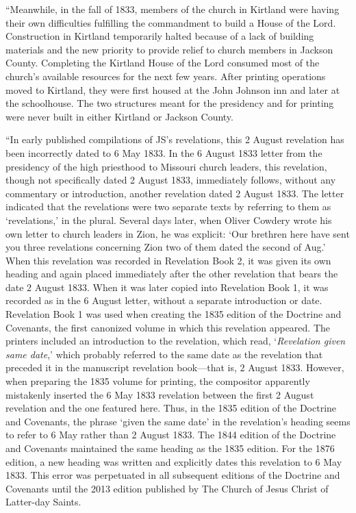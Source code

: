 			``Meanwhile, in the fall of 1833, members of the church in Kirtland were having their own difficulties fulfilling the commandment to build a House of the Lord. Construction in Kirtland temporarily halted because of a lack of building materials and the new priority to provide relief to church members in Jackson County. Completing the Kirtland House of the Lord consumed most of the church's available resources for the next few years. After printing operations moved to Kirtland, they were first housed at the John Johnson inn and later at the schoolhouse. The two structures meant for the presidency and for printing were never built in either Kirtland or Jackson County.
			
			``In early published compilations of JS's revelations, this 2 August revelation has been incorrectly dated to 6 May 1833. In the 6 August 1833 letter from the presidency of the high priesthood to Missouri church leaders, this revelation, though not specifically dated 2 August 1833, immediately follows, without any commentary or introduction, another revelation dated 2 August 1833. The letter indicated that the revelations were two separate texts by referring to them as `revelations,' in the plural. Several days later, when Oliver Cowdery wrote his own letter to church leaders in Zion, he was explicit: `Our brethren here have sent you three revelations concerning Zion two of them dated the second of Aug.' When this revelation was recorded in Revelation Book 2, it was given its own heading and again placed immediately after the other revelation that bears the date 2 August 1833. When it was later copied into Revelation Book 1, it was recorded as in the 6 August letter, without a separate introduction or date. Revelation Book 1 was used when creating the 1835 edition of the Doctrine and Covenants, the first canonized volume in which this revelation appeared. The printers included an introduction to the revelation, which read, `\textit{Revelation given same date},' which probably referred to the same date as the revelation that preceded it in the manuscript revelation book---that is, 2 August 1833. However, when preparing the 1835 volume for printing, the compositor apparently mistakenly inserted the 6 May 1833 revelation between the first 2 August revelation and the one featured here. Thus, in the 1835 edition of the Doctrine and Covenants, the phrase `given the same date' in the revelation's heading seems to refer to 6 May rather than 2 August 1833. The 1844 edition of the Doctrine and Covenants maintained the same heading as the 1835 edition. For the 1876 edition, a new heading was written and explicitly dates this revelation to 6 May 1833. This error was perpetuated in all subsequent editions of the Doctrine and Covenants until the 2013 edition published by The Church of Jesus Christ of Latter-day Saints.
			
